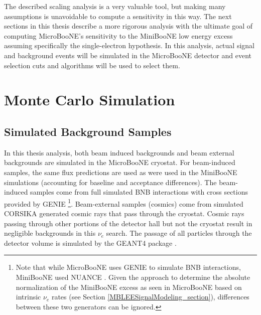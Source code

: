 The described scaling analysis is a very valuable tool, but making many assumptions is unavoidable to compute a sensitivity in this way. The next sections in this thesis describe a more rigorous analysis with the ultimate goal of computing MicroBooNE's sensitivity to the MiniBooNE low energy excess assuming specifically the single-electron hypothesis. In this analysis, actual signal and background events will be simulated in the MicroBooNE detector and event selection cuts and algorithms will be used to select them.














\section{Monte Carlo Simulation}

\subsection{Simulated Background Samples}\label{LEE_simulated_background_samples_section}
In this thesis analysis, both beam induced backgrounds and beam external backgrounds are simulated in the MicroBooNE cryostat. For beam-induced samples, the same flux predictions are used as were used in the MiniBooNE simulations (accounting for baseline and acceptance differences). The beam-induced samples come from full simulated BNB interactions with cross sections provided by GENIE \cite{GENIEsource}\footnote{Note that while MicroBooNE uses GENIE to simulate BNB interactions, MiniBooNE used NUANCE \cite{NUANCEsource}. Given the approach to determine the absolute normalization of the MiniBooNE excess as seen in MicroBooNE based on intrinsic $\nu_e$ rates (see Section \ref{MBLEESignalModeling_section}), differences between these two generators can be ignored.}. Beam-external samples (cosmics) come from simulated CORSIKA generated \cite{CORSIKAsource} cosmic rays that pass through the cryostat. Cosmic rays passing through other portions of the detector hall but not the cryostat result in negligible backgrounds in this $\nu_e$ search. The passage of all particles through the detector volume is simulated by the {\sc GEANT4} package \cite{GEANT4source}. 


